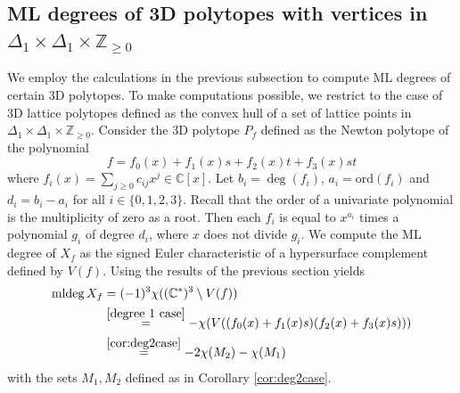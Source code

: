 \documentclass[12pt,reqno]{amsart}   	%
\theoremstyle{plain}
\theoremstyle{definition}
\theoremstyle{remark}
\newcommand{\Z}{\mathbb{Z}}
\newcommand{\C}{\mathbb{C}}
\newcommand{\mldeg}{\operatorname{mldeg}}
\newcommand{\ord}{\mathrm{ord}}
\begin{document}
\subsection{ML degrees of 3D polytopes with vertices in $\Delta_1\times \Delta_1\times \Z_{\geq0}$} \label{sec:reduction}
We  employ the calculations in the previous subsection to compute ML degrees of certain 3D polytopes. To make computations possible, we 
restrict to the case of 3D lattice polytopes
defined as the convex hull
of a set of lattice points in $\Delta_1\times \Delta_1\times \Z_{\geq 0}$.
Consider the 3D polytope $P_{f}$ defined as the Newton polytope of the polynomial
\[
    f = f_0(x) + f_1(x)s + f_2(x)t + f_3(x)st
\] 
where $f_i(x)=\sum_{j\geq 0}c_{ij}x^j\in \C[x]$.  Let $b_i=\deg(f_i)$, $a_i=\ord(f_i)$ and $d_i=b_i-a_i$ for all $i\in \{0,1,2,3\}$. Recall that the order
of a univariate polynomial is the multiplicity of zero as a root. Then each $f_i$ is equal to $x^{a_i}$ times a polynomial $g_i$ of degree $d_i$, where $x$ does not divide $g_i$. We compute the ML degree of $X_{f}$ as the signed Euler characteristic of a hypersurface complement defined by $V(f)$. Using the results of the previous section yields
\begin{align}\label{computation 3d polytopes}
    \mldeg X_{f} &=  (-1)^3\chi((\C^\ast)^3\setminus V(f)) \nonumber \\
      &\overset{\ref{degree 1 case}}{=}  -\chi ( V((f_0(x) + f_1(x)s)(f_2(x)+f_3(x)s))) \nonumber \\
    &\overset{\ref{cor:deg2case}}{=} -2\chi(M_2)-\chi(M_1)
\end{align}
with the sets $M_1,M_2$ defined as in Corollary \ref{cor:deg2case}. 
\end{document}
